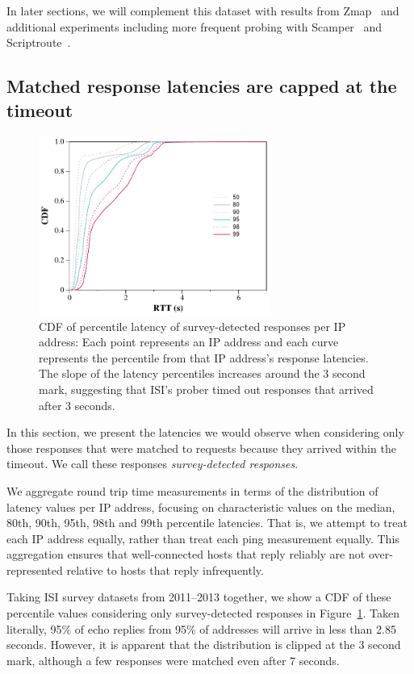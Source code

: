 In later sections, we will complement this dataset with
results from Zmap~\cite{durumeric2013zmap} and additional experiments
including more frequent probing with Scamper~\cite{luckie2010scamper} and
Scriptroute~\cite{usits03-spring}.

\subsection{Matched response latencies are capped at the timeout}

\begin{figure}[tb]
\begin{center}
\includegraphics[width=3in]{timeouts/figs/cdf_raw_ping_ttl}
\end{center}
\caption{\label{fig:raw_lat}%
CDF of percentile latency of survey-detected responses per IP address: Each point represents an IP address
and each curve represents the percentile from that IP address's
response latencies. The slope of the latency
percentiles increases around the 3 second mark, suggesting that
ISI's prober timed out responses that arrived after 3 seconds.
}
\end{figure}

In this section, we present the latencies we would observe
when considering only those responses that were matched to 
requests because they arrived within the timeout.  We call 
these responses \emph{survey-detected responses}.

We aggregate round trip time measurements in terms of the
distribution of latency values per IP address, focusing on
characteristic values on the median, 80th, 90th, 95th, 98th
and 99th percentile latencies.  That is, we attempt to treat
each IP address equally, rather than treat each ping
measurement equally.  This aggregation ensures that
well-connected hosts that reply reliably are not
over-represented relative to hosts that reply infrequently.

Taking ISI survey datasets from 2011--2013 together, we show a CDF of
these percentile values considering only survey-detected
responses in Figure~\ref{fig:raw_lat}.  Taken literally, 95\%
of echo replies from 95\% of addresses will arrive in less than
2.85 seconds.  However, it is apparent that the distribution
is clipped at the 3 second mark, although a few responses
were matched even after 7 seconds.   

